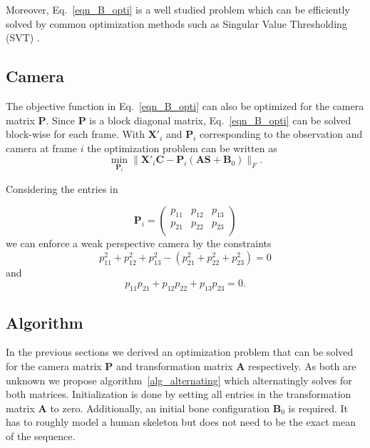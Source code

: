 \documentclass[10pt,letterpaper]{article}
\begin{document}
Moreover, Eq.~\eqref{eqn_B_opti} is a well studied problem which can be efficiently solved by common optimization methods such as Singular Value Thresholding (SVT) \cite{CandesSVT2009}.

\subsection{Camera}
\label{sec_camera}
The objective function in Eq.~\eqref{eqn_B_opti} can also be optimized for the camera matrix $\bm{P}$. Since $\bm{P}$ is a block diagonal matrix, Eq.~\eqref{eqn_B_opti} can be solved block-wise for each frame. With $\bm{X}'_i$ and $\bm{P}_i$ corresponding to the observation and camera at frame $i$ the optimization problem can be written as
\begin{equation}
\label{eqn_opt_camera}
\min_{\bm{P}_i} \| \bm{X}'_i \bm{C} - \bm{P}_i(\bm{AS}+\bm{B}_0) \|_F
.
\end{equation}

Considering the entries in

\begin{equation}
\bm{P}_i = 
\left(\begin{array}{cccc}
p_{11} & p_{12} & p_{13}\\
p_{21} & p_{22} & p_{23}\\
\end{array} \right)
\end{equation}
we can enforce a weak perspective camera by the constraints
\begin{equation}
p_{11}^2+p_{12}^2+p_{13}^2 -(p_{21}^2+p_{22}^2+p_{23}^2) = 0 
\end{equation}
and
\begin{equation}
p_{11} p_{21} + p_{12} p_{22} + p_{13} p_{23} = 0
.
\end{equation}

\subsection{Algorithm}
\label{sec_algorithm}
In the previous sections we derived an optimization problem that can be solved for the camera matrix $\bm{P}$ and transformation matrix $\bm{A}$ respectively. As both are unknown we propose algorithm~\ref{alg_alternating} which alternatingly solves for both matrices. Initialization is done by setting all entries in the transformation matrix $\bm{A}$ to zero. Additionally, an initial bone configuration $\bm{B}_0$ is required. It has to roughly model a human skeleton but does not need to be the exact mean of the sequence. %
\end{document}
